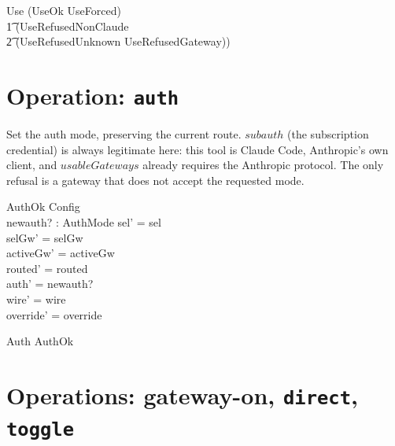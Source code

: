 \documentclass{article}
\begin{document}

\begin{zed}
  Use  (UseOk \lor UseForced) \lor \\
  \t1 (UseRefusedNonClaude \lor \\
  \t2 (UseRefusedUnknown \lor UseRefusedGateway))
\end{zed}

\section{Operation: \texttt{auth}}

Set the auth mode, preserving the current route. $subauth$ (the subscription
credential) is always legitimate here: this tool is Claude Code, Anthropic's own
client, and $usableGateways$ already requires the Anthropic protocol. The only
refusal is a gateway that does not accept the requested mode.

\begin{schema}{AuthOk}
  \Delta Config \\
  newauth? : AuthMode
\where
  sel' = sel \\
  selGw' = selGw \\
  activeGw' = activeGw \\
  routed' = routed \\
  auth' = newauth? \\
  wire' = wire \\
  override' = override
\end{schema}

\begin{zed}
  Auth  AuthOk
\end{zed}

\section{Operations: gateway-on, \texttt{direct}, \texttt{toggle}}
\end{document}
